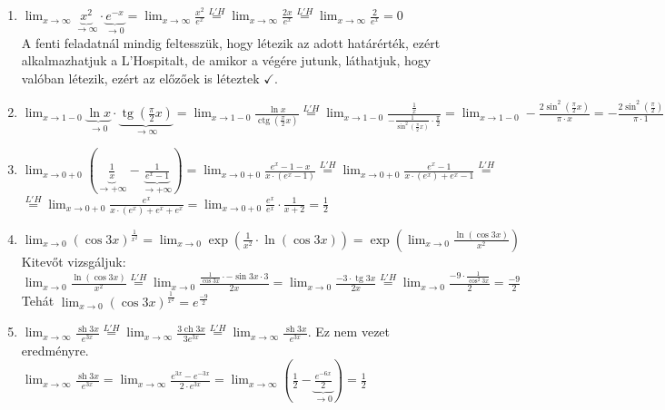 \documentclass[a4paper,12pt,twoside]{book}
\DeclareMathOperator{\tg}{tg}
\DeclareMathOperator{\ctg}{ctg}
\DeclareMathOperator{\sh}{sh} %
\DeclareMathOperator{\ch}{ch} %
\theoremstyle{break}
\theoremstyle{plain}
\begin{document}
\begin{enumerate}
 \item $\displaystyle \lim_{x\to\infty} \underbrace{x^2}_{\to \infty}\cdot \underbrace{e^{-x}}_{\to 0} = \lim_{x\to\infty} \frac{x^2}{e^x} \overset{L'H}{=} \lim_{x\to\infty} \frac{2x}{e^x} \overset{L'H}{=} \lim_{x\to\infty} \frac{2}{e^x} = 0$\\
 A fenti feladatnál mindig feltesszük, hogy létezik az adott határérték, ezért alkalmazhatjuk a L'Hospitalt, de amikor a végére jutunk, láthatjuk, hogy valóban létezik, ezért az előzőek is léteztek $\checkmark$.

 \item $\displaystyle \lim_{x\to 1-0} \underbrace{\ln x}_{\to 0}\cdot \underbrace{\tg \left(\frac{\pi}{2}x\right)}_{\to \infty} = \lim_{x\to 1-0} \frac{\ln x}{\ctg \left(\frac{\pi}{2}x\right)} \overset{L'H}{=} \lim_{x\to 1-0} \frac{\frac{1}{x}}{-\frac{1}{\sin^2 \left(\frac{\pi}{2}x\right)}\cdot \frac{\pi}{2}} = \lim_{x\to 1-0} -\frac{2\sin^2 \left(\frac{\pi}{2}x\right)}{\pi\cdot x} = -\frac{2\sin^2 \left(\frac{\pi}{2}\right)}{\pi\cdot 1} = \frac{-2}{\pi}$

 \item $\displaystyle \lim_{x\to 0+0} \left(\underbrace{\frac{1}{x}}_{\to +\infty} - \underbrace{\frac{1}{e^x-1}}_{\to +\infty} \right) = \lim_{x\to 0+0} \frac{e^x-1-x}{x\cdot(e^x-1)} \overset{L'H}{=} \lim_{x\to 0+0} \frac{e^x-1}{x\cdot(e^x)+e^x-1} \overset{L'H}{=} $\vspace*{8pt}\\
 $\displaystyle \overset{L'H}{=} \lim_{x\to 0+0} \frac{e^x}{x\cdot(e^x)+e^x+e^x} = \lim_{x\to 0+0} \frac{e^x}{e^x}\cdot\frac{1}{x+2} = \frac{1}{2}$

 \item $\displaystyle \lim_{x\to 0} (\cos 3x)^{\frac{1}{x^2}} = \lim_{x\to 0} \exp\left(\frac{1}{x^2}\cdot \ln(\cos 3x)\right) = \exp\left(\lim_{x\to 0} \frac{\ln(\cos 3x)}{x^2} \right)$ Kitevőt vizsgáljuk:\vspace*{8pt}\\
 $\displaystyle \lim_{x\to 0} \frac{\ln(\cos 3x)}{x^2} \overset{L'H}{=} \lim_{x\to 0} \frac{\frac{1}{\cos 3x}\cdot -\sin 3x\cdot 3}{2x} = \lim_{x\to 0} \frac{-3\cdot \tg 3x}{2x} \overset{L'H}{=} \lim_{x\to 0} \frac{-9\cdot \frac{1}{\cos^2 3x}}{2} = \frac{-9}{2}$\vspace*{8pt}\\
 Tehát $\displaystyle \lim_{x\to 0} (\cos 3x)^{\frac{1}{x^2}} = e^{\frac{-9}{2}}$

 \item $\displaystyle \lim_{x\to\infty} \frac{\sh 3x}{e^{3x}} \overset{L'H}{=} \lim_{x\to\infty} \frac{3\ch 3x}{3e^{3x}} \overset{L'H}{=} \lim_{x\to\infty} \frac{\sh 3x}{e^{3x}}$. Ez nem vezet eredményre.\vspace*{8pt}\\
 $\displaystyle \lim_{x\to\infty} \frac{\sh 3x}{e^{3x}} = \lim_{x\to\infty} \frac{e^{3x}-e^{-3x}}{2\cdot e^{3x}} = \lim_{x\to\infty} \left(\frac{1}{2}-\underbrace{\frac{e^{-6x}}{2}}_{\to 0}\right) = \frac{1}{2}$
\end{enumerate}
\end{document}
